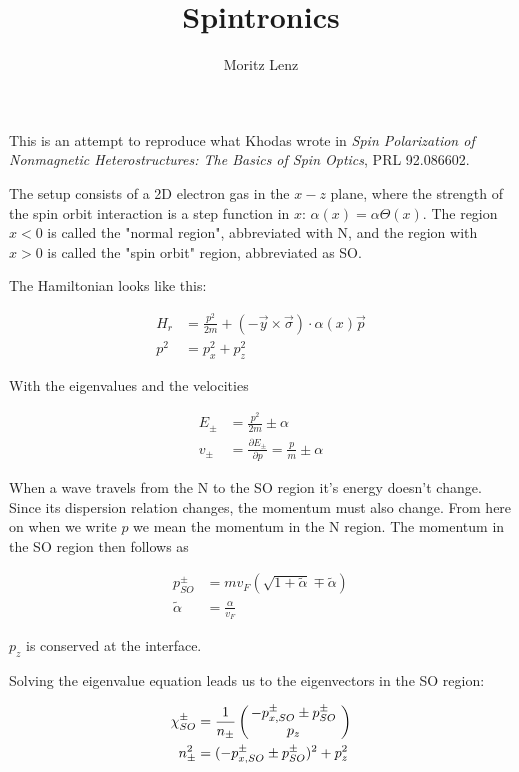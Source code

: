 \documentclass[11pt]{article}
\author{Moritz Lenz}
\title{Spintronics}
\newcommand{\inp}[1]{\ensuremath{\left(#1\right)}}
\newcommand{\vect}[2]{\ensuremath{\inp{\hspace{-.8ex}\begin{array}{c}#1\\#2\end{array}\hspace{-.4ex}}}}
\begin{document}
\maketitle

This is an attempt to reproduce what Khodas wrote in {\em Spin 
Polarization of Nonmagnetic Heterostructures: The Basics of Spin
Optics}, PRL 92.086602.

The setup consists of a 2D electron gas in the $x-z$ plane, where the
strength of the spin orbit interaction is a step function in $x$:
$\alpha(x) = \alpha \Theta(x)$. The region $x < 0$ is called the
"normal region", abbreviated with N, and the region with $x > 0$ is
called the "spin orbit" region, abbreviated as SO.

The Hamiltonian looks like this:

\begin{align}
    H_r &= \frac{p^2}{2m} + (-\vec y \times \vec \sigma) \cdot
            \alpha(x) \vec p\\ 
    p^2 &= p_x^2 + p_z^2
\end{align}

With the eigenvalues and the velocities

\begin{align}
    E_{\pm} &= \frac{p^2}{2m} \pm \alpha \\
    v_{\pm} &= \frac{\partial E_{\pm}}{\partial p} = \frac{p}{m} \pm \alpha
\end{align}

When a wave travels from the N to the SO region it's energy doesn't
change. Since its dispersion relation changes, the momentum must also
change. From here on when we write $p$ we mean the momentum in the N
region. The momentum in the SO region then follows as

\begin{align}
    \label{eq:pso}
    p_{SO}^{\pm} &= m v_F (\sqrt{1 + \tilde \alpha} \mp \tilde \alpha) \\
    \tilde\alpha &= \frac{\alpha}{v_F}
\end{align}

$p_z$ is conserved at the interface.

Solving the eigenvalue equation leads us to the eigenvectors in the SO
region:

\begin{align*}
   \chi_{SO}^{\pm} &= \frac{1}{n_{\pm}} 
                      \vect{-p_{x,SO}^{\pm} \pm p_{SO}^\pm}{p_z} \\
    n_{\pm}^2      &= (-p_{x,SO}^{\pm} \pm p_{SO}^\pm)^2 + p_z^2
\end{align*}
\end{document}
